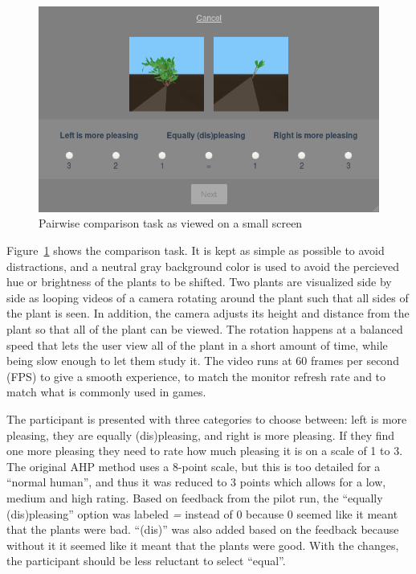 \begin{figure}
    \centering
    \includegraphics[width=1.0\textwidth]{figures/pairwise}
    \caption{Pairwise comparison task as viewed on a small screen}
    \label{fig:pairwise}
\end{figure}

Figure~\ref{fig:pairwise} shows the comparison task.
It is kept as simple as possible to avoid distractions, and a neutral gray background color is used to avoid the percieved hue or brightness of the plants to be shifted.
Two plants are visualized side by side as looping videos of a camera rotating around the plant such that all sides of the plant is seen.
In addition, the camera adjusts its height and distance from the plant so that all of the plant can be viewed.
The rotation happens at a balanced speed that lets the user view all of the plant in a short amount of time, while being slow enough to let them study it.
The video runs at 60 frames per second (FPS) to give a smooth experience, to match the monitor refresh rate and to match what is commonly used in games.

The participant is presented with three categories to choose between: left is more pleasing, they are equally (dis)pleasing, and right is more pleasing.
If they find one more pleasing they need to rate how much pleasing it is on a scale of 1 to 3.
The original AHP method uses a 8-point scale, but this is too detailed for a ``normal human'', and thus it was reduced to 3 points which allows for a low, medium and high rating.
Based on feedback from the pilot run, the ``equally (dis)pleasing'' option was labeled \textit{=} instead of 0 because 0 seemed like it meant that the plants were bad.
``(dis)'' was also added based on the feedback because without it it seemed like it meant that the plants were good.
With the changes, the participant should be less reluctant to select ``equal''.

